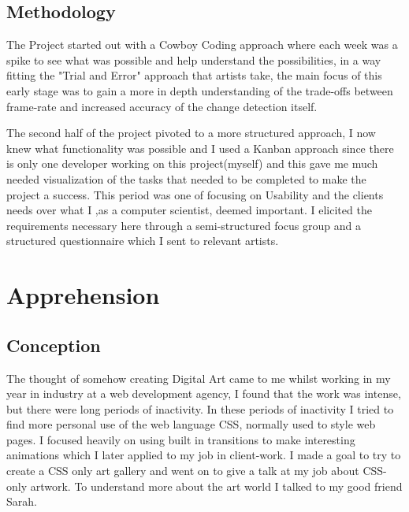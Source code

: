 \documentclass[a4paper]{report}
\begin{document}
\subsection{Methodology}
The Project started out with a Cowboy Coding approach where each week was a spike to see what was possible and help understand the possibilities, in a way fitting the "Trial and Error" approach that artists take, the main focus of this early stage was to gain a more in depth understanding of the trade-offs between frame-rate and increased accuracy of the change detection itself.

The second half of the project pivoted to a more structured approach, I now knew what functionality was possible and I used a Kanban\cite{KANBAN} approach since there is only one developer working on this project(myself) and this gave me much needed visualization of the tasks that needed to be completed to make the project a success. This period was one of focusing on Usability and the clients needs over what I ,as a computer scientist, deemed important. I elicited the requirements necessary here through a semi-structured focus group and a structured questionnaire which I sent to relevant artists.

\section{Apprehension}
\subsection{Conception}
The thought of somehow creating Digital Art came to me whilst working in my year in industry at a web development agency, I found that the work was intense, but there were long periods of inactivity. In these periods of inactivity I tried to find more personal use of the web language CSS, normally used to style web pages. I focused heavily on using built in transitions to make interesting animations which I later applied to my job in client-work. I made a goal to try to create a CSS only art gallery and went on to give a talk at my job about CSS-only artwork. To understand more about the art world I talked to my good friend Sarah.
\end{document}
